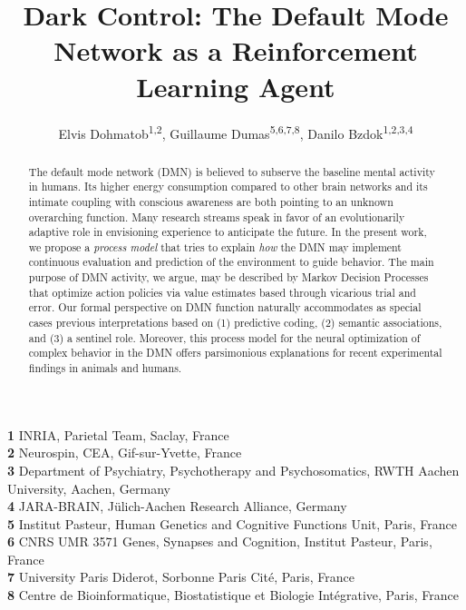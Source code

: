 \documentclass[10pt,letterpaper]{article}
\date{}
\title{Dark Control: The Default Mode Network as a Reinforcement Learning Agent}
\begin{document}
\author{Elvis Dohmatob\textsuperscript{1,2}, Guillaume Dumas\textsuperscript{5,6,7,8}, Danilo Bzdok\textsuperscript{1,2,3,4}
}

\maketitle
\small{
    \textbf{1} INRIA, Parietal Team, Saclay, France\\
    \textbf{2} Neurospin, CEA, Gif-sur-Yvette, France\\
    \textbf{3} Department of Psychiatry, Psychotherapy and Psychosomatics, RWTH Aachen University, Aachen, Germany\\
    \textbf{4} JARA-BRAIN, J\"ulich-Aachen Research Alliance, Germany\\
    \textbf{5} Institut Pasteur, Human Genetics and Cognitive Functions Unit, Paris, France\\
    \textbf{6} CNRS UMR 3571 Genes, Synapses and Cognition, Institut Pasteur, Paris, France\\
    \textbf{7} University Paris Diderot, Sorbonne Paris Cit\'e, Paris, France\\
    \textbf{8} Centre de Bioinformatique, Biostatistique et Biologie Int\'egrative, Paris, France
}

\begin{abstract}
The default mode network (DMN) is believed to subserve the
baseline mental activity in humans.
%
Its higher energy consumption compared to other brain networks and
its intimate coupling with conscious awareness are both pointing to
an unknown overarching function.
%
Many research streams speak in favor of an evolutionarily adaptive role in
envisioning experience to anticipate the future.
In the present work, we propose a \textit{process model}
that tries to explain \textit{how}
the DMN may implement
continuous evaluation and prediction of the environment to guide behavior.
%
%
The main purpose of DMN activity, we argue,
may be described by Markov Decision Processes
that optimize action policies via value estimates
based through vicarious trial and error.
%
Our formal perspective on DMN function naturally accommodates as special cases
previous interpretations based on
(1) predictive coding,
(2) semantic associations, and
(3) a sentinel role.
%
Moreover, this process model for the neural optimization of complex behavior in the DMN
offers parsimonious explanations for
recent experimental findings in animals and humans.
\end{abstract}
\end{document}

